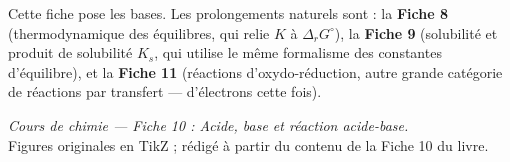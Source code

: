 \documentclass[11pt,a4paper]{article}
\begin{document}
\begin{remarque}[prolongements]
Cette fiche pose les bases. Les prolongements naturels sont : la \textbf{Fiche 8} (thermodynamique des
équilibres, qui relie $K$ à $\Delta_r G^\circ$), la \textbf{Fiche 9} (solubilité et produit de solubilité
$K_s$, qui utilise le même formalisme des constantes d'équilibre), et la \textbf{Fiche 11} (réactions
d'oxydo-réduction, autre grande catégorie de réactions par transfert — d'électrons cette fois).
\end{remarque}

\vfill
\begin{center}
\small\color{black!55}
\textit{Cours de chimie — Fiche 10 : Acide, base et réaction acide-base.}\\
Figures originales en TikZ ; rédigé à partir du contenu de la Fiche 10 du livre.
\end{center}
\end{document}
